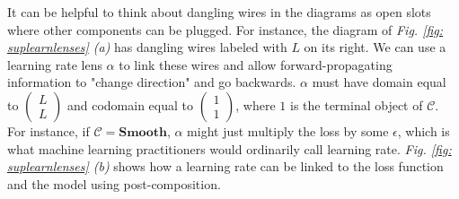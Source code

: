 \documentclass[11pt,a4paper,openright,twoside]{report}
\theoremstyle{plain}
\theoremstyle{definition}
\begin{document}
It can be helpful to think about dangling wires in the diagrams as open slots where other components can be plugged. For instance, the diagram of \textit{Fig. \ref{fig: suplearnlenses} (a)} has dangling wires labeled with $L$ on its right. We can use a learning rate lens $\alpha$ to link these wires and allow forward-propagating information to "change direction" and go backwards. $\alpha$ must have domain equal to $\left( \begin{smallmatrix} L \\ L \end{smallmatrix} \right)$ and codomain equal to $\left(\begin{smallmatrix} 1 \\ 1 \end{smallmatrix}\right)$, where $1$ is the terminal object of $\mathcal{C}$. For instance, if $\mathcal{C} = \mathbf{Smooth}$, $\alpha$ might just multiply the loss by some $\epsilon$, which is what machine learning practitioners would ordinarily call learning rate. \textit{Fig. \ref{fig: suplearnlenses} (b)} shows how a learning rate can be linked to the loss function and the model using post-composition.
\end{document}
